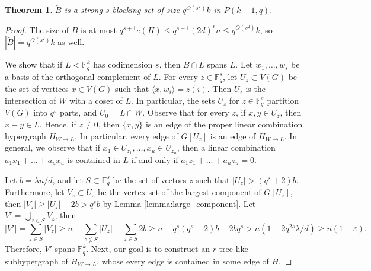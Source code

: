 \documentclass[11pt]{article}
\theoremstyle{plain}
\newtheorem{theorem}{Theorem}
\theoremstyle{definition}
\begin{document}
\begin{theorem}\label{thm:small_q}
$\tilde{B}$ is a strong $s$-blocking set of size $q^{O(s^2)} k$ in $P(k-1,q)$.
\end{theorem}

\begin{proof}
The size of $B$ is at most $q^{s+1}e(H)\leq q^{s+1}(2d)^r n \leq q^{O(s^2)}k$, so  $|\tilde{B}|=q^{O(s^2)}k$ as well.

We show that if $L<\mathbb{F}_q^k$ has codimension $s$, then $B\cap L$ spans $L$. Let $w_1,\dots,w_s$ be a basis of the orthogonal complement of $L$. For every $z\in \mathbb{F}_q^s$, let $U_z\subset V(G)$ be the set of vertices $x\in V(G)$ such that $\langle x,w_i\rangle =z(i)$. Then $U_z$ is the intersection of $W$ with a coset of $L$. In particular, the sets $U_z$ for $z\in  \mathbb{F}_q^s$ partition $V(G)$ into $q^s$ parts, and $U_0=L\cap W$. Observe that for every $z$, if $x,y\in U_z$, then $x-y\in L$. Hence, if $z\neq 0$, then $\{x,y\}$ is an edge of the proper linear combination hypergraph $H_{W\rightarrow L}$. In particular, every edge of $G[U_z]$ is an edge of $H_{W\rightarrow L}$. In general, we observe that if $x_1\in U_{z_1},\dots,x_{u}\in U_{z_u}$, then a linear combination $a_1 x_1+\dots+a_u x_u$ is contained in $L$ if and only if $a_1z_1+\dots+a_u z_u=0$.

Let $b=\lambda n/d$, and let $S\subset \mathbb{F}_q^s$ be the set of vectors $z$ such that $|U_z|>(q^s+2) b$. Furthermore, let $V_z\subset U_z$ be the vertex set of the largest component of $G[U_z]$, then $|V_z|\geq |U_z|-2b> q^s b$ by Lemma \ref{lemma:large_component}. Let $V'=\bigcup_{z\in S}V_z$, then
$$|V'|=\sum_{z\in S}|V_z|\geq n-\sum_{z\not\in S}|U_z|-\sum_{z\in S}2b\geq n-q^s (q^s+2)b-2bq^s>n(1-2q^{2s}\lambda/d)\geq n(1-\varepsilon).$$
Therefore, $V'$ spans $\mathbb{F}_q^k$. Next, our goal is to construct an $r$-tree-like subhypergraph of $H_{W\rightarrow L}$, whose every edge is contained in some edge of $H$.




\end{proof}
\end{document}
